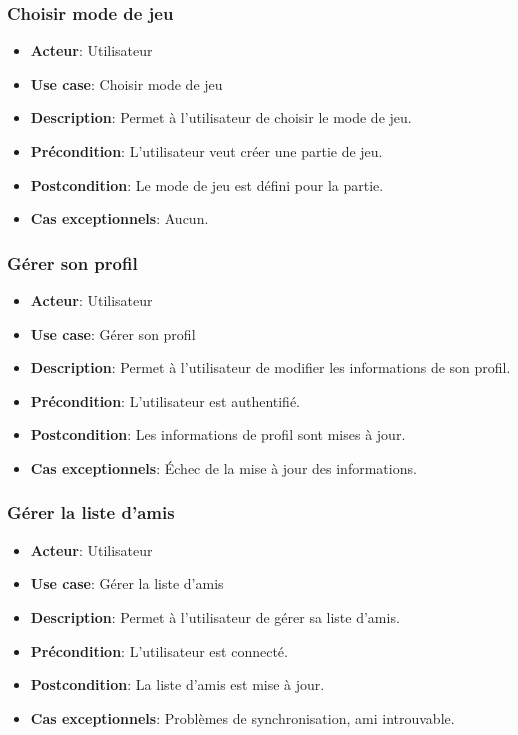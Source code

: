 \documentclass{article}
\begin{document}
\subsubsection*{Choisir mode de jeu}
\begin{itemize}
    \item \textbf{Acteur}: Utilisateur
    \item \textbf{Use case}: Choisir mode de jeu
    \item \textbf{Description}: Permet à l'utilisateur de choisir le mode de jeu.
    \item \textbf{Précondition}: L'utilisateur veut créer une partie de jeu.
    \item \textbf{Postcondition}: Le mode de jeu est défini pour la partie.
    \item \textbf{Cas exceptionnels}: Aucun.
\end{itemize}

\subsubsection*{Gérer son profil}
\begin{itemize}
    \item \textbf{Acteur}: Utilisateur
    \item \textbf{Use case}: Gérer son profil
    \item \textbf{Description}: Permet à l'utilisateur de modifier les informations de son profil.
    \item \textbf{Précondition}: L'utilisateur est authentifié.
    \item \textbf{Postcondition}: Les informations de profil sont mises à jour.
    \item \textbf{Cas exceptionnels}: Échec de la mise à jour des informations.
\end{itemize}

\subsubsection*{Gérer la liste d'amis}
\begin{itemize}
    \item \textbf{Acteur}: Utilisateur
    \item \textbf{Use case}: Gérer la liste d'amis
    \item \textbf{Description}: Permet à l'utilisateur de gérer sa liste d'amis.
    \item \textbf{Précondition}: L'utilisateur est connecté.
    \item \textbf{Postcondition}: La liste d'amis est mise à jour.
    \item \textbf{Cas exceptionnels}: Problèmes de synchronisation, ami introuvable.
\end{itemize}
\end{document}
